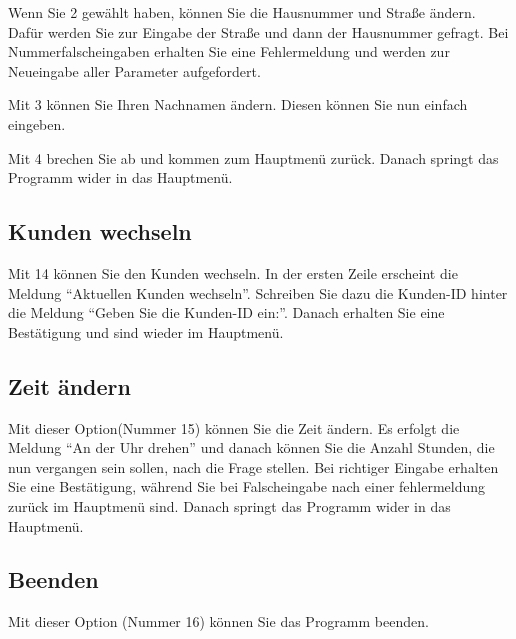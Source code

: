 \documentclass[a4paper,12pt,titlepage]{article}
\begin{document}
Wenn Sie 2 gewählt haben, können Sie die Hausnummer und Straße ändern.
Dafür werden Sie zur Eingabe der Straße und dann der Hausnummer gefragt.
Bei Nummerfalscheingaben erhalten Sie eine Fehlermeldung und werden zur Neueingabe aller Parameter aufgefordert.

Mit 3 können Sie Ihren Nachnamen ändern. Diesen können Sie nun einfach eingeben.

Mit 4 brechen Sie ab und kommen zum Hauptmenü zurück.
Danach springt das Programm wider in das Hauptmenü.
\subsection{Kunden wechseln}
Mit 14 können Sie den Kunden wechseln.
In der ersten Zeile erscheint die Meldung \enquote{Aktuellen Kunden wechseln}.
Schreiben Sie dazu die Kunden-ID hinter die Meldung \enquote{Geben Sie die Kunden-ID ein:}.
Danach erhalten Sie eine Bestätigung und sind wieder im Hauptmenü.

\subsection{Zeit ändern}
Mit dieser Option(Nummer 15) können Sie die Zeit ändern.
Es erfolgt die Meldung \enquote{An der Uhr drehen} und danach können Sie die Anzahl Stunden,
 die nun vergangen sein sollen, nach die Frage stellen.
Bei richtiger Eingabe erhalten Sie eine Bestätigung,
 während Sie bei Falscheingabe nach einer fehlermeldung zurück im Hauptmenü sind.
Danach springt das Programm wider in das Hauptmenü.
\subsection{Beenden}
Mit dieser Option (Nummer 16) können Sie das Programm beenden.
\end{document}
